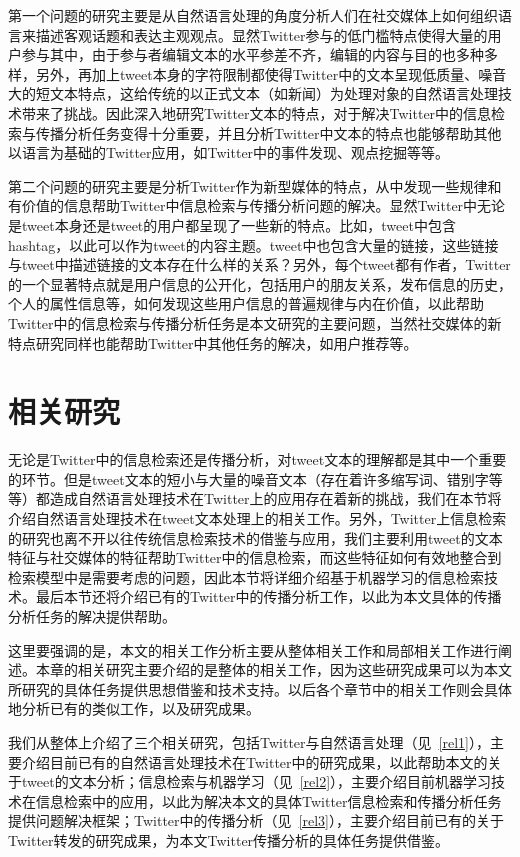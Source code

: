第一个问题的研究主要是从自然语言处理的角度分析人们在社交媒体上如何组织语言来描述客观话题和表达主观观点。显然Twitter参与的低门槛特点使得大量的用户参与其中，由于参与者编辑文本的水平参差不齐，编辑的内容与目的也多种多样，另外，再加上tweet本身的字符限制都使得Twitter中的文本呈现低质量、噪音大的短文本特点，这给传统的以正式文本（如新闻）为处理对象的自然语言处理技术带来了挑战。因此深入地研究Twitter文本的特点，对于解决Twitter中的信息检索与传播分析任务变得十分重要，并且分析Twitter中文本的特点也能够帮助其他以语言为基础的Twitter应用，如Twitter中的事件发现、观点挖掘等等。

第二个问题的研究主要是分析Twitter作为新型媒体的特点，从中发现一些规律和有价值的信息帮助Twitter中信息检索与传播分析问题的解决。显然Twitter中无论是tweet本身还是tweet的用户都呈现了一些新的特点。比如，tweet中包含hashtag，以此可以作为tweet的内容主题。tweet中也包含大量的链接，这些链接与tweet中描述链接的文本存在什么样的关系？另外，每个tweet都有作者，Twitter的一个显著特点就是用户信息的公开化，包括用户的朋友关系，发布信息的历史，个人的属性信息等，如何发现这些用户信息的普遍规律与内在价值，以此帮助Twitter中的信息检索与传播分析任务是本文研究的主要问题，当然社交媒体的新特点研究同样也能帮助Twitter中其他任务的解决，如用户推荐等。

\section{相关研究}
无论是Twitter中的信息检索还是传播分析，对tweet文本的理解都是其中一个重要的环节。但是tweet文本的短小与大量的噪音文本（存在着许多缩写词、错别字等等）都造成自然语言处理技术在Twitter上的应用存在着新的挑战，我们在本节将介绍自然语言处理技术在tweet文本处理上的相关工作。另外，Twitter上信息检索的研究也离不开以往传统信息检索技术的借鉴与应用，我们主要利用tweet的文本特征与社交媒体的特征帮助Twitter中的信息检索，而这些特征如何有效地整合到检索模型中是需要考虑的问题，因此本节将详细介绍基于机器学习的信息检索技术。最后本节还将介绍已有的Twitter中的传播分析工作，以此为本文具体的传播分析任务的解决提供帮助。

这里要强调的是，本文的相关工作分析主要从整体相关工作和局部相关工作进行阐述。本章的相关研究主要介绍的是整体的相关工作，因为这些研究成果可以为本文所研究的具体任务提供思想借鉴和技术支持。以后各个章节中的相关工作则会具体地分析已有的类似工作，以及研究成果。

我们从整体上介绍了三个相关研究，包括Twitter与自然语言处理（见~\ref{rel1}），主要介绍目前已有的自然语言处理技术在Twitter中的研究成果，以此帮助本文的关于tweet的文本分析；信息检索与机器学习（见~\ref{rel2}），主要介绍目前机器学习技术在信息检索中的应用，以此为解决本文的具体Twitter信息检索和传播分析任务提供问题解决框架；Twitter中的传播分析（见~\ref{rel3}），主要介绍目前已有的关于Twitter转发的研究成果，为本文Twitter传播分析的具体任务提供借鉴。

